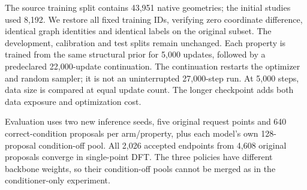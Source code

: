 \documentclass[11pt,a4paper]{article}
\begin{document}
The source training split contains 43,951 native geometries; the initial
studies used 8,192. We restore all fixed training IDs, verifying zero
coordinate difference, identical graph identities and identical labels
on the original subset. The development, calibration and test splits
remain unchanged. Each property is trained from the same structural
prior for 5,000 updates, followed by a predeclared 22,000-update
continuation. The continuation restarts the optimizer and random
sampler; it is not an uninterrupted 27,000-step run. At 5,000 steps,
data size is compared at equal update count. The longer checkpoint adds
both data exposure and optimization cost.

Evaluation uses two new inference seeds, five original request points
and 640 correct-condition proposals per arm/property, plus each model's
own 128-proposal condition-off pool. All 2,026 accepted endpoints from
4,608 original proposals converge in single-point DFT. The three
policies have different backbone weights, so their condition-off pools
cannot be merged as in the conditioner-only experiment.
\end{document}
